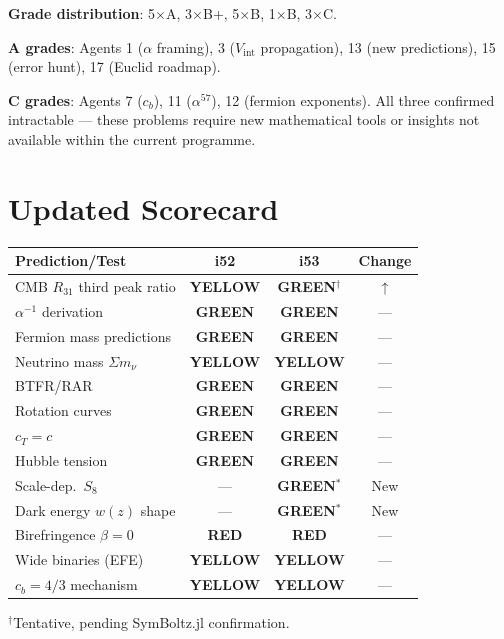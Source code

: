 \documentclass[11pt,a4paper]{article}
\newcommand{\GREEN}{\textcolor{dfdgreen}{\textbf{GREEN}}}
\newcommand{\YELLOW}{\textcolor{dfdyellow}{\textbf{YELLOW}}}
\newcommand{\RED}{\textcolor{dfdred}{\textbf{RED}}}
\begin{document}
\textbf{Grade distribution}: 5$\times$A, 3$\times$B+, 5$\times$B, 1$\times$B, 3$\times$C.

\textbf{A grades}: Agents 1 ($\alpha$ framing), 3 ($V_{\mathrm{int}}$ propagation), 13 (new predictions), 15 (error hunt), 17 (Euclid roadmap).

\textbf{C grades}: Agents 7 ($c_b$), 11 ($\alpha^{57}$), 12 (fermion exponents). All three confirmed intractable --- these problems require new mathematical tools or insights not available within the current programme.


\section{Updated Scorecard}
\label{sec:scorecard}

\begin{center}
\begin{longtable}{p{5cm}ccc}
\toprule
\textbf{Prediction/Test} & \textbf{i52} & \textbf{i53} & \textbf{Change} \\
\midrule
\endfirsthead
CMB $R_{31}$ third peak ratio & \YELLOW & \GREEN$^\dagger$ & $\uparrow$ \\
$\alpha^{-1}$ derivation & \GREEN & \GREEN & --- \\
Fermion mass predictions & \GREEN & \GREEN & --- \\
Neutrino mass $\Sigma m_\nu$ & \YELLOW & \YELLOW & --- \\
BTFR/RAR & \GREEN & \GREEN & --- \\
Rotation curves & \GREEN & \GREEN & --- \\
$c_T = c$ & \GREEN & \GREEN & --- \\
Hubble tension & \GREEN & \GREEN & --- \\
Scale-dep.\ $S_8$ & --- & \GREEN$^*$ & New \\
Dark energy $w(z)$ shape & --- & \GREEN$^*$ & New \\
Birefringence $\beta = 0$ & \RED & \RED & --- \\
Wide binaries (EFE) & \YELLOW & \YELLOW & --- \\
$c_b = 4/3$ mechanism & \YELLOW & \YELLOW & --- \\
\bottomrule
\end{longtable}
\end{center}

$^\dagger$Tentative, pending SymBoltz.jl confirmation.
\end{document}
